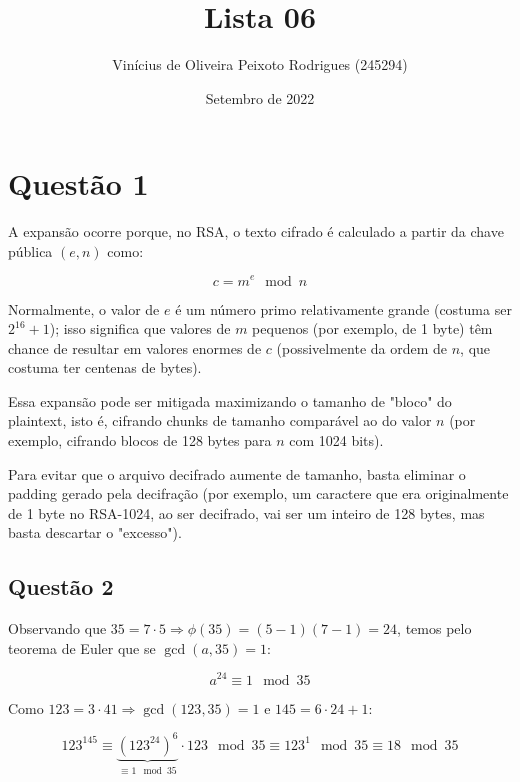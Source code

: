 \documentclass{article}
\title{Lista 06}
\author{Vinícius de Oliveira Peixoto Rodrigues (245294)}
\date{Setembro de 2022}
\begin{document}
\maketitle

\section*{Questão 1}

A expansão ocorre porque, no RSA, o texto cifrado é calculado a partir da chave pública $(e, n)$ como:

\begin{equation*}
    c = m^e \mod n
\end{equation*}

Normalmente, o valor de $e$ é um número primo relativamente grande (costuma ser $2^{16} + 1$); isso significa que valores de $m$ pequenos (por exemplo, de 1 byte) têm chance de resultar em valores enormes de $c$ (possivelmente da ordem de $n$, que costuma ter centenas de bytes).

Essa expansão pode ser mitigada maximizando o tamanho de "bloco" do plaintext, isto é, cifrando chunks de tamanho comparável ao do valor $n$ (por exemplo, cifrando blocos de 128 bytes para $n$ com 1024 bits).

Para evitar que o arquivo decifrado aumente de tamanho, basta eliminar o padding gerado pela decifração (por exemplo, um caractere que era originalmente de 1 byte no RSA-1024, ao ser decifrado, vai ser um inteiro de 128 bytes, mas basta descartar o "excesso").

\subsection*{Questão 2}

Observando que $35 = 7 \cdot 5 \Rightarrow \phi(35) = (5-1)(7-1) = 24$, temos pelo teorema de Euler que se $\gcd(a, 35) = 1$:

\begin{equation*}
    a^{24} \equiv 1 \mod 35
\end{equation*}

Como $123 = 3 \cdot 41 \Rightarrow \gcd(123, 35) = 1$ e $145 = 6 \cdot 24 + 1$:

\begin{equation*}
    123^{145} \equiv 
    \underbrace{\left(123^{24}\right)^6}_{\equiv 1 \mod 35} \cdot 123 \mod 35 \equiv 123^1 \mod 35 \equiv 18 \mod 35
\end{equation*}
\end{document}
